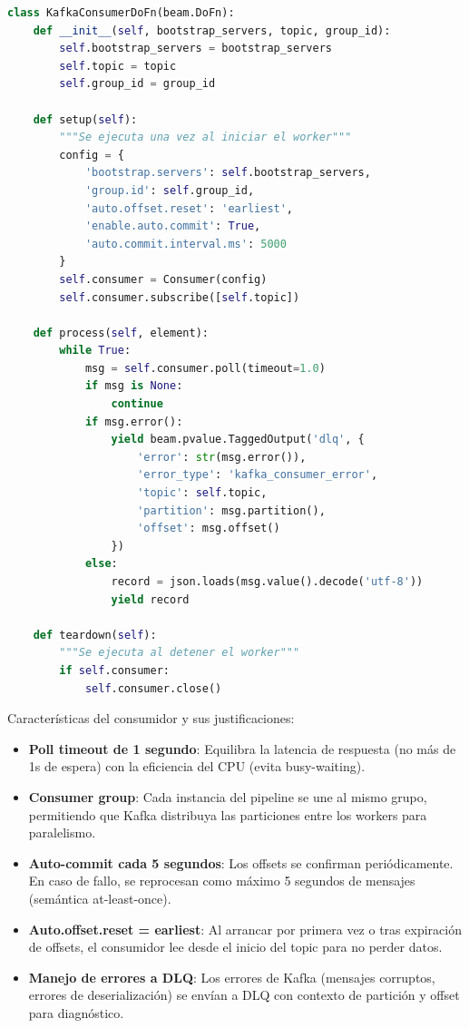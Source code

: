 \documentclass[12pt,a4paper]{article}
\begin{document}
\begin{lstlisting}[language=Python, caption=KafkaConsumerDoFn -- Lectura de Kafka en streaming]
class KafkaConsumerDoFn(beam.DoFn):
    def __init__(self, bootstrap_servers, topic, group_id):
        self.bootstrap_servers = bootstrap_servers
        self.topic = topic
        self.group_id = group_id

    def setup(self):
        """Se ejecuta una vez al iniciar el worker"""
        config = {
            'bootstrap.servers': self.bootstrap_servers,
            'group.id': self.group_id,
            'auto.offset.reset': 'earliest',
            'enable.auto.commit': True,
            'auto.commit.interval.ms': 5000
        }
        self.consumer = Consumer(config)
        self.consumer.subscribe([self.topic])

    def process(self, element):
        while True:
            msg = self.consumer.poll(timeout=1.0)
            if msg is None:
                continue
            if msg.error():
                yield beam.pvalue.TaggedOutput('dlq', {
                    'error': str(msg.error()),
                    'error_type': 'kafka_consumer_error',
                    'topic': self.topic,
                    'partition': msg.partition(),
                    'offset': msg.offset()
                })
            else:
                record = json.loads(msg.value().decode('utf-8'))
                yield record

    def teardown(self):
        """Se ejecuta al detener el worker"""
        if self.consumer:
            self.consumer.close()
\end{lstlisting}

Características del consumidor y sus justificaciones:

\begin{itemize}
    \item \textbf{Poll timeout de 1 segundo}: Equilibra la latencia de respuesta (no más de 1s de espera) con la eficiencia del CPU (evita busy-waiting).
    \item \textbf{Consumer group}: Cada instancia del pipeline se une al mismo grupo, permitiendo que Kafka distribuya las particiones entre los workers para paralelismo.
    \item \textbf{Auto-commit cada 5 segundos}: Los offsets se confirman periódicamente. En caso de fallo, se reprocesan como máximo 5 segundos de mensajes (semántica at-least-once).
    \item \textbf{Auto.offset.reset = earliest}: Al arrancar por primera vez o tras expiración de offsets, el consumidor lee desde el inicio del topic para no perder datos.
    \item \textbf{Manejo de errores a DLQ}: Los errores de Kafka (mensajes corruptos, errores de deserialización) se envían a DLQ con contexto de partición y offset para diagnóstico.
\end{itemize}
\end{document}
